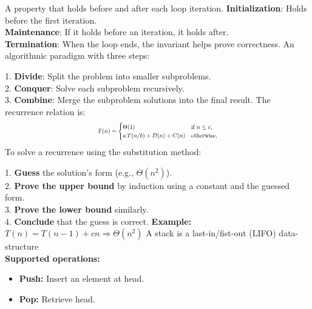 \documentclass[a4paper,landscape]{article}
\begin{document}
\begin{multicols}{7} %
\tcolorbox[mybox={Facts}]

\endtcolorbox
\tcolorbox[mybox={Loop Invariant}]
A property that holds before and after each loop iteration.
\textbf{Initialization}: Holds before the first iteration.\\
\textbf{Maintenance}: If it holds before an iteration, it holds after.\\
\textbf{Termination}: When the loop ends, the invariant helps prove correctness.
\endtcolorbox
\tcolorbox[mybox={Divide and Conquer}]
An algorithmic paradigm with three steps:

1. \textbf{Divide}: Split the problem into smaller subproblems.\\
2. \textbf{Conquer}: Solve each subproblem recursively.\\
3. \textbf{Combine}: Merge the subproblem solutions into the final result.
The recurrence relation is:
\[
\scalebox{0.70}{$
T(n) =
\begin{cases}
\Theta(1) & \text{if } n \leq c, \\
a\,T(n/b) + D(n) + C(n) & \text{otherwise},
\end{cases}
$}
\]
\endtcolorbox
\tcolorbox[mybox={Solving Recurrences}]
To solve a recurrence using the substitution method:

1. \textbf{Guess} the solution's form (e.g., \( \Theta(n^2) \)).\\
2. \textbf{Prove the upper bound} by induction using a constant and the guessed form.\\
3. \textbf{Prove the lower bound} similarly.\\
4. \textbf{Conclude} that the guess is correct.
\textbf{Example:}\\
\( T(n) = T(n - 1) + cn \Rightarrow \Theta(n^2) \)
\endtcolorbox
\tcolorbox[mybox={Stack}]
A stack is a last-in/fist-out (LIFO) data-structure\\
\textbf{Supported operations:}
\begin{itemize}[noitemsep,itemsep=0pt]
    \item \textbf{Push:} Insert an element at head.
    \item \textbf{Pop:} Retrieve head.
\end{itemize}
\endtcolorbox


\end{multicols}
\end{document}
